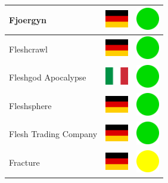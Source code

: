 \documentclass[12pt, a4paper, twoside]{report}
\begin{document}
\begin{center}
\begin{longtable}{|p{5cm}|p{2cm}|p{2cm}|}
			Fjoergyn & \includegraphics[width=1cm]{4x3/de} & \includegraphics[width=1cm]{likes/y} \\ \hline
			Fleshcrawl & \includegraphics[width=1cm]{4x3/de} & \includegraphics[width=1cm]{likes/y} \\ \hline
			Fleshgod Apocalypse & \includegraphics[width=1cm]{4x3/it} & \includegraphics[width=1cm]{likes/y} \\ \hline
			Fleshsphere & \includegraphics[width=1cm]{4x3/de} & \includegraphics[width=1cm]{likes/y} \\ \hline
			Flesh Trading Company & \includegraphics[width=1cm]{4x3/de} & \includegraphics[width=1cm]{likes/y} \\ \hline
			Fracture & \includegraphics[width=1cm]{4x3/de} & \includegraphics[width=1cm]{likes/m} \\ \hline

\end{longtable}
\end{center}
\end{document}

